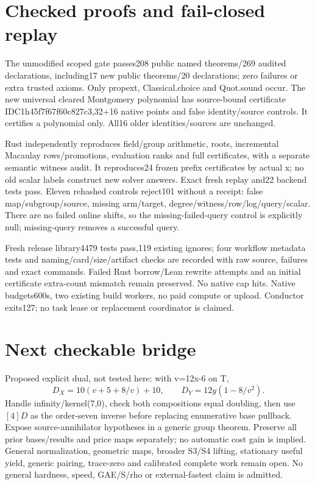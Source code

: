 \documentclass[10pt]{article}
\begin{document}
\section*{Checked proofs and fail-closed replay}
The unmodified scoped gate passes208 public named theorems/269 audited
declarations, including17 new public theorems/20 declarations; zero failures
or extra trusted axioms. Only propext, Classical.choice and Quot.sound occur.
The new universal cleared Montgomery polynomial has source-bound certificate
IDC1h45f7f67f60c827c3,32+16 native points and false identity/source controls.
It certifies a polynomial only. All16 older identities/sources are unchanged.

Rust independently reproduces field/group arithmetic, roots, incremental
Macaulay rows/promotions, evaluation ranks and full certificates, with a separate
semantic witness audit. It reproduces24 frozen prefix certificates by actual x;
no old scalar labels construct new solver answers. Exact fresh replay and22
backend tests pass. Eleven rehashed controls reject101 without a receipt:
false map/subgroup/source, missing arm/target, degree/witness/row/log/query/scalar.
There are no failed online shifts, so the missing-failed-query control is
explicitly null; missing-query removes a successful query.

Fresh release library4479 tests pass,119 existing ignores; four workflow
metadata tests and naming/card/size/artifact checks are recorded with raw source,
failures and exact commands. Failed Rust borrow/Lean rewrite attempts and an
initial certificate extra-count mismatch remain preserved. No native cap hits.
Native budgets600s, two existing build workers, no paid compute or upload.
Conductor exits127; no task lease or replacement coordinator is claimed.

\section*{Next checkable bridge}
Proposed explicit dual, not tested here: with v=12x-6 on T,
\[
 D_X=10(v+5+8/v)+10,\qquad D_Y=12y(1-8/v^2).
\]
Handle infinity/kernel(7,0), check both compositions equal doubling, then use
$[4]D$ as the order-seven inverse before replacing enumerative base pullback.
Expose source-annihilator hypotheses in a generic group theorem. Preserve all
prior bases/results and price maps separately; no automatic cost gain is implied.
General normalization, geometric maps, broader S3/S4 lifting, stationary useful
yield, generic pairing, trace-zero and calibrated complete work remain open.
No general hardness, speed, GAE/S/rho or external-fastest claim is admitted.
\end{document}
